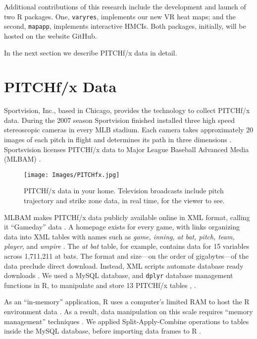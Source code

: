 Additional contributions of this research include the development and launch of two R packages. One, \verb|varyres|, implements our new VR heat maps; and the second, \verb|mapapp|, implements interactive HMCIs. Both packages, initially, will be hosted on the website GitHub.

In the next section we describe PITCHf/x\textsuperscript{\textregistered} data in detail.

\section{PITCHf/x\textsuperscript{\textregistered} Data} %
Sportvision, Inc., based in Chicago, provides the technology to collect PITCHf/x\textsuperscript{\textregistered} data. During the 2007 season Sportvision finished installed three high speed stereoscopic cameras in every MLB\textsuperscript{\textregistered} stadium. Each camera takes approximately 20 images of each pitch in flight and determines its path in three dimensions \citep{Fast2010}. Sportsvision licenses PITCHf/x\textsuperscript{\textregistered} data to Major League Baseball Advanced Media (MLBAM\textsuperscript{\textregistered}) \citep{Baumer2010}. 

        \begin{figure}[H]
      	\centering
      	\texttt{[image: Images/PITCHfx.jpg]} 
      	\caption{PITCHf/x\textsuperscript{\textregistered} data in your home. Television broadcasts include pitch trajectory and strike zone data, in real time, for the viewer to see.}
      	\label{fig:fx1}
      	\end{figure} 
MLBAM\textsuperscript{\textregistered} makes PITCHf/x\textsuperscript{\textregistered} data publicly available online in XML format, calling it ``Gameday'' data \citep{Sievert2014}. A homepage exists for every game, with links organizing data into XML tables with names such as {\it game, inning, at bat, pitch, team, player}, and {\it umpire} \citep{Sievert2014}. The {\it at bat} table, for example, contains data for 15 variables across 1,711,211 at bats. The format and size---on the order of gigabytes---of the data preclude direct download. Instead, XML scripts automate database ready downloads \citep{Adler2006}. We used a MySQL database, and \verb|dplyr| database management functions in R, to manipulate and store 13 PITCHf/x\textsuperscript{\textregistered} tables \citep{Tahaghoghi2006}, \citep{Wickham2016}. 

As an ``in-memory'' application, R uses a computer's limited RAM to host the R environment data \citep{Smith2013}. As a result, data manipulation on this scale requires ``memory management'' techniques \citep{Wickham2014}.  We applied Split-Apply-Combine operations to tables inside the MySQL database, before importing data frames to R \citep{Wickham2011}.

